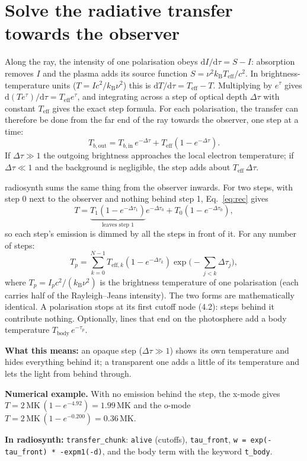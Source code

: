 \documentclass[11pt,a4paper]{article}
\newcommand{\dd}{\mathrm{d}}
\newcommand{\kB}{k_\mathrm{B}}
\newcommand{\code}[1]{\texttt{#1}}
\newcommand{\example}[1]{\par\noindent\colorbox{boxbg}{\parbox{\dimexpr\linewidth-2\fboxsep}{\small\textbf{Numerical example.} #1}}\par}
\newcommand{\whatitmeans}[1]{\par{\color{head}\textbf{What this means:}} #1\par}
\newcommand{\incode}[1]{\par{\small\color{head!80!black}\textbf{In radiosynth:} #1}\par}
\begin{document}
\section{Solve the radiative transfer towards the observer}
Along the ray, the intensity of one polarisation obeys $\dd I/\dd\tau=S-I$: absorption removes $I$ and the
plasma adds its source function $S=\nu^2\kB T_\text{eff}/c^2$. In brightness-temperature units
($T=Ic^2/\kB\nu^2$) this is $\dd T/\dd\tau=T_\text{eff}-T$. Multiplying by $e^{\tau}$ gives $\dd(Te^{\tau})/\dd\tau=T_\text{eff}e^{\tau}$, and
integrating across a step of optical depth $\Delta\tau$ with constant $T_\text{eff}$ gives the exact step formula.
For each polarisation, the transfer can therefore be done from the far end of the ray towards the
observer, one step at a time:
\begin{equation}
  T_{b,\text{out}}=T_{b,\text{in}}\,e^{-\Delta\tau}+T_\text{eff}\left(1-e^{-\Delta\tau}\right).
  \label{eq:rec}
\end{equation}
If $\Delta\tau\gg1$ the outgoing brightness approaches the local electron temperature; if $\Delta\tau\ll1$
and the background is negligible, the step adds about $T_\text{eff}\,\Delta\tau$.

radiosynth sums the same thing from the observer inwards. For two steps, with step 0 next to
the observer and nothing behind step 1, Eq.~\eqref{eq:rec} gives
\begin{equation}
  T=\underbrace{T_1\left(1-e^{-\Delta\tau_1}\right)}_{\text{leaves step 1}}e^{-\Delta\tau_0}+T_0\left(1-e^{-\Delta\tau_0}\right),
\end{equation}
so each step's emission is dimmed by all the steps in front of it. For any number of steps:
\begin{equation}
  T_p=\sum_{k=0}^{N-1}T_{\text{eff},k}\left(1-e^{-\Delta\tau_k}\right)\exp\!\Big(-\sum_{j<k}\Delta\tau_j\Big),
\end{equation}
where $T_p=I_pc^2/(\kB\nu^2)$ is the brightness temperature of one polarisation (each carries half
of the Rayleigh--Jeans intensity). The two forms are mathematically identical. A polarisation
stops at its first cutoff node (4.2): steps behind it contribute nothing. Optionally, lines that
end on the photosphere add a body temperature $T_\text{body}\,e^{-\tau_p}$.
\whatitmeans{an opaque step ($\Delta\tau\gg1$) shows its own temperature and hides everything behind it; a transparent one
adds a little of its temperature and lets the light from behind through.}
\example{With no emission behind the step, the x-mode gives $T=2\,\text{MK}\,(1-e^{-4.92})=1.99$\,MK
and the o-mode $T=2\,\text{MK}\,(1-e^{-0.200})=0.36$\,MK.}
\incode{\code{transfer\_chunk}: \code{alive} (cutoffs), \code{tau\_front}, \code{w = exp(-tau\_front) *
-expm1(-d)}, and the body term with the keyword \code{t\_body}.}
\end{document}
